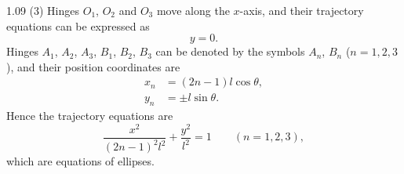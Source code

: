 \begin{solution}{1.09}
(3) Hinges $O_1$, $O_2$ and $O_3$ move along the $x$-axis, and their trajectory equations can be
expressed as
\begin{equation*}
y = 0.
\end{equation*}
Hinges $A_1$, $A_2$, $A_3$, $B_1$, $B_2$, $B_3$ can be denoted by the symbols $A_n$, $B_n$
($n=1,2,3$), and their position coordinates are
\begin{align*}
x_n &= (2n-1)l\cos\theta,\\
y_n &= \pm l\sin\theta.
\end{align*}
Hence the trajectory equations are
\begin{equation*}
\frac{x^2}{(2n-1)^2l^2}+\frac{y^2}{l^2} = 1\qquad (n=1,2,3),
\end{equation*}
which are equations of ellipses.
\end{solution}

